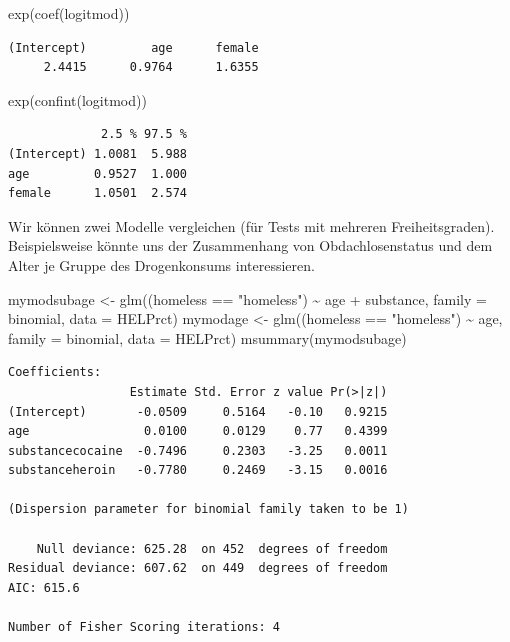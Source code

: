 \documentclass[
  ngerman,
]{scrbook}
\newenvironment{Shaded}{\begin{snugshade}}{\end{snugshade}}
\newcommand{\AttributeTok}[1]{\textcolor[rgb]{0.77,0.63,0.00}{#1}}
\newcommand{\FunctionTok}[1]{\textcolor[rgb]{0.00,0.00,0.00}{#1}}
\newcommand{\NormalTok}[1]{#1}
\newcommand{\OtherTok}[1]{\textcolor[rgb]{0.56,0.35,0.01}{#1}}
\newcommand{\SpecialCharTok}[1]{\textcolor[rgb]{0.00,0.00,0.00}{#1}}
\newcommand{\StringTok}[1]{\textcolor[rgb]{0.31,0.60,0.02}{#1}}
\begin{document}
\begin{Shaded}
\begin{Highlighting}[]
\FunctionTok{exp}\NormalTok{(}\FunctionTok{coef}\NormalTok{(logitmod))}
\end{Highlighting}
\end{Shaded}

\begin{verbatim}
(Intercept)         age      female 
     2.4415      0.9764      1.6355 
\end{verbatim}

\begin{Shaded}
\begin{Highlighting}[]
\FunctionTok{exp}\NormalTok{(}\FunctionTok{confint}\NormalTok{(logitmod))}
\end{Highlighting}
\end{Shaded}

\begin{verbatim}
             2.5 % 97.5 %
(Intercept) 1.0081  5.988
age         0.9527  1.000
female      1.0501  2.574
\end{verbatim}

Wir können zwei Modelle vergleichen (für Tests mit mehreren Freiheitsgraden). Beispielsweise könnte uns der Zusammenhang von Obdachlosenstatus und dem Alter je Gruppe des Drogenkonsums interessieren.

\begin{Shaded}
\begin{Highlighting}[]
\NormalTok{mymodsubage }\OtherTok{\textless{}{-}} \FunctionTok{glm}\NormalTok{((homeless }\SpecialCharTok{==} \StringTok{"homeless"}\NormalTok{) }\SpecialCharTok{\textasciitilde{}}\NormalTok{ age }\SpecialCharTok{+}\NormalTok{ substance, }
                     \AttributeTok{family =}\NormalTok{ binomial, }\AttributeTok{data =}\NormalTok{ HELPrct)}
\NormalTok{mymodage }\OtherTok{\textless{}{-}} \FunctionTok{glm}\NormalTok{((homeless }\SpecialCharTok{==} \StringTok{"homeless"}\NormalTok{) }\SpecialCharTok{\textasciitilde{}}\NormalTok{ age, }\AttributeTok{family =}\NormalTok{ binomial, }
                  \AttributeTok{data =}\NormalTok{ HELPrct)}
\FunctionTok{msummary}\NormalTok{(mymodsubage)}
\end{Highlighting}
\end{Shaded}

\begin{verbatim}
Coefficients:
                 Estimate Std. Error z value Pr(>|z|)
(Intercept)       -0.0509     0.5164   -0.10   0.9215
age                0.0100     0.0129    0.77   0.4399
substancecocaine  -0.7496     0.2303   -3.25   0.0011
substanceheroin   -0.7780     0.2469   -3.15   0.0016

(Dispersion parameter for binomial family taken to be 1)

    Null deviance: 625.28  on 452  degrees of freedom
Residual deviance: 607.62  on 449  degrees of freedom
AIC: 615.6

Number of Fisher Scoring iterations: 4
\end{verbatim}
\end{document}
